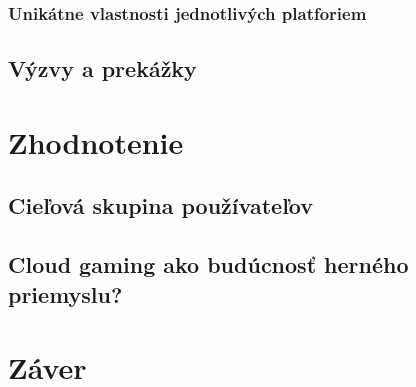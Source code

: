 \documentclass[10pt,twoside,slovak,a4paper]{article}
\begin{document}
\subsubsection{Unikátne vlastnosti jednotlivých platforiem}

\subsection{Výzvy a prekážky}



\section{Zhodnotenie}

\subsection{Cieľová skupina používateľov}

\subsection{Cloud gaming ako budúcnosť herného priemyslu?}



\section{Záver}






\end{document}
